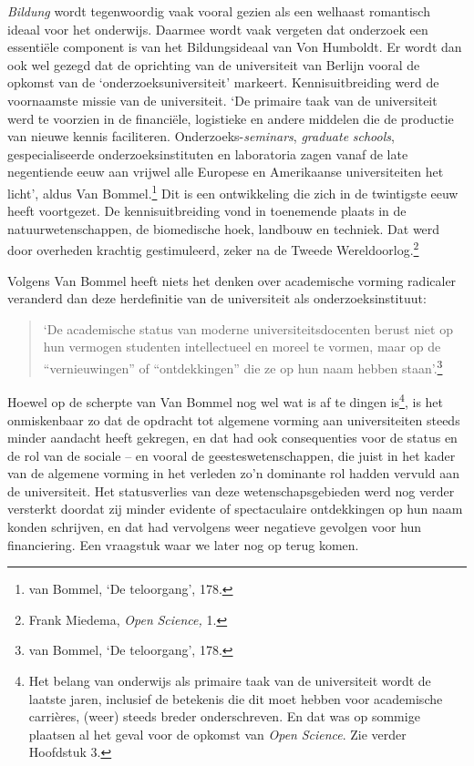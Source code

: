 \documentclass[smallauthor, chapterhaspagenum, nochapterinheader, pagenuminheader,  bigchapnum,medium2, tocpages, garamond, titleinheader]{jote-book}
\begin{document}
	\emph{Bildung} wordt tegenwoordig vaak vooral gezien als een welhaast romantisch ideaal voor het onderwijs. Daarmee wordt vaak vergeten dat onderzoek een essentiële component is van het Bildungsideaal van Von Humboldt. Er wordt dan ook wel gezegd dat de oprichting van de universiteit van Berlijn vooral de opkomst van de ‘onderzoeksuniversiteit' markeert. Kennisuitbreiding werd de voornaamste missie van de universiteit. ‘De primaire taak van de universiteit werd te voorzien in de financiële, logistieke en andere middelen die de productie van nieuwe kennis faciliteren. Onderzoeks-\emph{seminars}, \emph{graduate}\emph{ schools}, gespecialiseerde onderzoeksinstituten en laboratoria zagen vanaf de late negentiende eeuw aan vrijwel alle Europese en Amerikaanse universiteiten het licht', aldus Van Bommel.\footnote{van Bommel, ‘De teloorgang', 178.} Dit is een ontwikkeling die zich in de twintigste eeuw heeft voortgezet. De kennisuitbreiding vond in toenemende plaats in de natuurwetenschappen, de biomedische hoek, landbouw en techniek. Dat werd door overheden krachtig gestimuleerd, zeker na de Tweede Wereldoorlog.\footnote{Frank Miedema, \emph{Open }\emph{Science}\emph{, }1.}



	Volgens Van Bommel heeft niets het denken over academische vorming radicaler veranderd dan deze herdefinitie van de universiteit als onderzoeksinstituut:

	\begin{quote}
		\itshape

		‘De academische status van moderne universiteitsdocenten berust niet op hun vermogen studenten intellectueel en moreel te vormen, maar op de “vernieuwingen” of “ontdekkingen” die ze op hun naam hebben staan'.\footnote{van Bommel, ‘De teloorgang', 178.}
	\end{quote}

	Hoewel op de scherpte van Van Bommel nog wel wat is af te dingen is\footnote{Het belang van onderwijs als primaire taak van de universiteit wordt de laatste jaren, inclusief de betekenis die dit moet hebben voor academische carrières, (weer) steeds breder onderschreven. En dat was op sommige plaatsen al het geval voor de opkomst van \emph{Open }\emph{Science}. Zie verder Hoofdstuk 3.}, is het onmiskenbaar zo dat de opdracht tot algemene vorming aan universiteiten steeds minder aandacht heeft gekregen, en dat had ook consequenties voor de status en de rol van de sociale -- en vooral de geesteswetenschappen, die juist in het kader van de algemene vorming in het verleden zo'n dominante rol hadden vervuld aan de universiteit. Het statusverlies van deze wetenschapsgebieden werd nog verder versterkt doordat zij minder evidente of spectaculaire ontdekkingen op hun naam konden schrijven, en dat had vervolgens weer negatieve gevolgen voor hun financiering. Een vraagstuk waar we later nog op terug komen.
\end{document}
